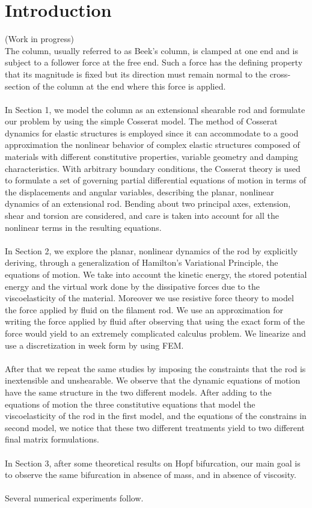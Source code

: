 \documentclass[12pt]{article}
\begin{document}
\section{Introduction}
(Work in progress)
\\
The column, usually referred to as Beek's column, is clamped at one end and is subject to a follower force at the  free end.
Such a force has the defining property that its magnitude is fixed but its direction must remain normal to the cross-section of the column at the end where this force is applied.
\\\\
In Section 1, we model the column as an extensional shearable rod and formulate our problem by using the simple Cosserat model. 
The method of Cosserat dynamics for elastic structures is employed since it can accommodate to a good approximation the nonlinear behavior of complex elastic structures composed of materials with different constitutive properties, variable geometry and damping characteristics. With arbitrary boundary conditions, the Cosserat theory is used to formulate a set of governing partial differential equations of motion in terms of the displacements and angular variables, describing the planar, nonlinear dynamics of an extensional rod. Bending about two principal axes, extension, shear and torsion are considered, and care is taken into account for all the nonlinear terms in the resulting equations. 
\\\\
In Section 2, we explore the planar, nonlinear dynamics of the rod by explicitly deriving, through a generalization of Hamilton's Variational Principle, the equations of motion. We take into account the kinetic energy, the stored potential energy and the virtual work done by the dissipative forces due to the viscoelasticity of the material. Moreover we use resistive force theory to model the force applied by fluid on the filament rod. We use an approximation for writing the force applied by fluid after observing that using the exact form of the force would yield to an extremely complicated calculus problem. We linearize and use a discretization in week form by using FEM.
\\\\
After that we repeat the same studies by imposing the constraints that the rod is inextensible and unshearable.
We observe that the dynamic equations of motion have the same structure in the two different models. After adding to the equations of motion the three constitutive equations that model the viscoelasticity of the rod in the first model, and the equations of the constrains in second model, we notice that these two different treatments yield to two different final matrix formulations.
\\\\
In Section 3, after some theoretical results on Hopf bifurcation, our main goal is to observe the same bifurcation in absence of mass, and in absence of viscosity.
\\\\
Several numerical experiments follow.
\end{document}

